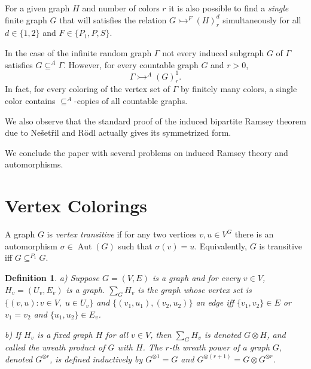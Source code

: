 \documentclass[11pt]{amsart}
\newcommand{\ars}{\rightarrowtail}
\newcommand{\su}{\subseteq}
\newcommand{\aut}{\operatorname{Aut}}
\newcommand{\id}{\operatorname{id}}
\newtheorem{definition}[theorem]{Definition}
\begin{document}
For a given graph $H$ and number of colors $r$ it is also possible
to find a \emph{single} finite graph $G$ that will satisfies the
relation $G\rightarrowtail^F (H)^d_r$ simultaneously for all $d\in
\{1,2\}$ and $F\in\{P_1,P, S\}$.

 In the case of the infinite
random graph $\Gamma$ not
 every induced subgraph $G$ of $\Gamma$ satisfies $G\su ^A
\Gamma$.
However,  for every countable graph $G$ and
$r>0$,
\begin{equation}
\Gamma\ars^A(G)^1_r.
\end{equation}
In fact, for every coloring of the vertex set of $\Gamma$ by finitely
many colors, a single color  contains $\su^A$-copies of all
countable graphs.

We also observe that the standard proof of the induced bipartite
Ramsey
theorem due to Ne\v set\v ril and  R\"odl actually gives its
symmetrized form.

We conclude the paper with several problems on induced Ramsey theory
and
automorphisms.



\section{Vertex Colorings}




A graph $G$ is \emph{vertex transitive} if for any two vertices
$v,u\in V^G$ there is an automorphism $\sigma \in \aut (G)$ such
that $\sigma(v)=u$. Equivalently, $G$ is transitive iff $G\su^{P_1}G$.




\begin{definition}
a) Suppose $G=( V,E)$ is a graph and for every $v\in V$,
  $H_v=(U_v,E_v)$ is a graph. $\sum_G H_v$ is the graph whose
  vertex set is $\{(v,u):v\in V,\; u\in U_v\}$ and
  $\{(v_1,u_1),(v_2,u_2)\}$ an edge iff $\{v_1,v_2\}\in E$ or
  $v_1=v_2$ and $\{u_1,u_2\}\in E_v$.

b) If $H_v$ is a fixed graph $H$ for all $v\in V$, then $\sum_G H_v$
  is denoted $G\otimes H$, and called the \emph{wreath product} of $G$
  with $H$. The \emph{$r$-th wreath power} of a graph $G$, denoted
  $G^{\otimes r}$, is defined inductively by $G^{\otimes 1}=G$ and
  $G^{\otimes (r+1)}=G\otimes G^{\otimes r}$.
\end{definition}
\end{document}

